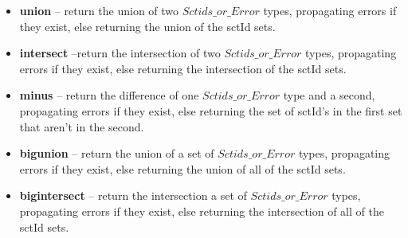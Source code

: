 \documentclass{article}
\begin{document}
\begin{itemize}[noitemsep]
\item \textbf{union} -- return the union of two $Sctids\_or\_Error$ types, propagating errors if they exist, else returning the union of the sctId sets.
\item \textbf{intersect} --return the intersection of two $Sctids\_or\_Error$ types, propagating errors if they exist, else returning the intersection of the sctId sets.
\item \textbf{minus} -- return the difference of one $Sctids\_or\_Error$ type and a second, propagating errors if they exist, else returning the set of sctId's in the first set that aren't in the second. 
\item \textbf{bigunion} -- return the union of a set of $Sctids\_or\_Error$ types, propagating errors if they exist, else returning the union of  all of the sctId sets.
\item \textbf{bigintersect} -- return the intersection a set of $Sctids\_or\_Error$ types, propagating errors if they exist, else returning the intersection of all of  the sctId sets.
\end{itemize}
\end{document}
